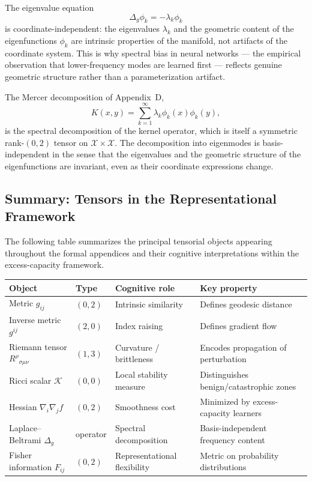 \documentclass[12pt,a4paper]{article}
\begin{document}
The eigenvalue equation
\[
\Delta_g \phi_k = -\lambda_k \phi_k
\]
is coordinate-independent: the eigenvalues $\lambda_k$ and the geometric content of the eigenfunctions $\phi_k$ are intrinsic properties of the manifold, not artifacts of the coordinate system. This is why spectral bias in neural networks --- the empirical observation that lower-frequency modes are learned first --- reflects genuine geometric structure rather than a parameterization artifact.

The Mercer decomposition of Appendix~D,
\[
K(x, y) = \sum_{k=1}^\infty \lambda_k \phi_k(x) \phi_k(y),
\]
is the spectral decomposition of the kernel operator, which is itself a symmetric rank-$(0, 2)$ tensor on $\mathcal{X} \times \mathcal{X}$. The decomposition into eigenmodes is basis-independent in the sense that the eigenvalues and the geometric structure of the eigenfunctions are invariant, even as their coordinate expressions change.

\subsection{Summary: Tensors in the Representational Framework}

The following table summarizes the principal tensorial objects appearing throughout the formal appendices and their cognitive interpretations within the excess-capacity framework.

\begin{center}
\begin{tabular}{llll}
\toprule
Object & Type & Cognitive role & Key property \\
\midrule
Metric $g_{ij}$ & $(0,2)$ & Intrinsic similarity & Defines geodesic distance \\
Inverse metric $g^{ij}$ & $(2,0)$ & Index raising & Defines gradient flow \\
Riemann tensor $R^\rho{}_{\sigma\mu\nu}$ & $(1,3)$ & Curvature / brittleness & Encodes propagation of perturbation \\
Ricci scalar $\mathcal{K}$ & $(0,0)$ & Local stability measure & Distinguishes benign/catastrophic zones \\
Hessian $\nabla_i\nabla_j f$ & $(0,2)$ & Smoothness cost & Minimized by excess-capacity learners \\
Laplace--Beltrami $\Delta_g$ & operator & Spectral decomposition & Basis-independent frequency content \\
Fisher information $F_{ij}$ & $(0,2)$ & Representational flexibility & Metric on probability distributions \\
\bottomrule
\end{tabular}
\end{center}
\end{document}
